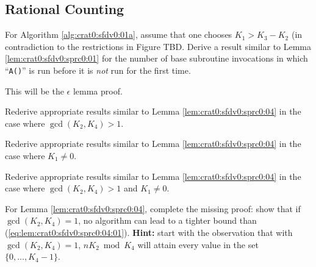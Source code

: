 \subsection{Rational Counting}


\begin{vworkexercisestatement}
\label{exe:crat0:sexe0:01}
For Algorithm \ref{alg:crat0:sfdv0:01a}, 
assume that one chooses $K_1 > K_3 - K_2$ (in contradiction to the
restrictions in Figure TBD.
Derive a result similar to Lemma \ref{lem:crat0:sfdv0:sprc0:01}
for the number of base subroutine invocations in which 
``\texttt{A()}'' is run before it is
\emph{not} run for the first time.
\end{vworkexercisestatement}
\vworkexercisefooter{}

\begin{vworkexercisestatement}
\label{exe:crat0:sexe0:02}
This will be the $\epsilon$ lemma proof.
\end{vworkexercisestatement}
\vworkexercisefooter{}

\begin{vworkexercisestatement}
\label{exe:crat0:sexe0:03}
Rederive appropriate results similar to 
Lemma \ref{lem:crat0:sfdv0:sprc0:04} in the case where 
$\gcd(K_2, K_4) > 1$.
\end{vworkexercisestatement}
\vworkexercisefooter{}

\begin{vworkexercisestatement}
\label{exe:crat0:sexe0:04}
Rederive appropriate results similar to
Lemma \ref{lem:crat0:sfdv0:sprc0:04} in the case where 
$K_1 \neq 0$.
\end{vworkexercisestatement}
\vworkexercisefooter{}

\begin{vworkexercisestatement}
\label{exe:crat0:sexe0:05}
Rederive appropriate results similar to
Lemma \ref{lem:crat0:sfdv0:sprc0:04} in the case where 
$\gcd(K_2, K_4) > 1$ and $K_1 \neq 0$.
\end{vworkexercisestatement}
\vworkexercisefooter{}

\begin{vworkexercisestatement}
\label{exe:crat0:sexe0:06}
For Lemma \ref{lem:crat0:sfdv0:sprc0:04},
complete the missing proof:
show that if $\gcd(K_2, K_4) = 1$, no algorithm can
lead to a tighter bound than (\ref{eq:lem:crat0:sfdv0:sprc0:04:01}).
\textbf{Hint:} start with the observation
that with
$\gcd(K_2, K_4) = 1$, $n K_2 \bmod K_4$ will attain every value in
the set $\{ 0, \ldots , K_4-1 \}$.
\end{vworkexercisestatement}
\vworkexercisefooter{}

